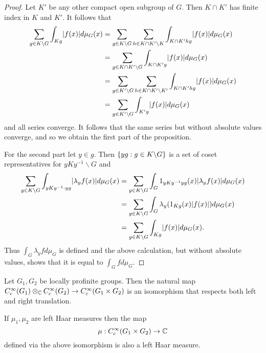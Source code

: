 \documentclass{memoir}
\begin{document}
\begin{proof}
    Let $K'$ be any other compact open subgroup of $G$.
    Then $K\cap K'$ has finite index in $K$ and $K'$.
    It follows that 
    \begin{align}
        \sum_{g\in K\backslash G}\int_{Kg}\lvert f(x)\rvert d\mu_G(x) &= \sum_{g\in K\backslash G}\sum_{h\in K\cap K'\backslash K}\int_{K\cap K' hg}\lvert f(x)\rvert d\mu_G(x) \nonumber \\
                                                              &= \sum_{g\in K\cap K'\backslash G}\int_{K\cap K' g}\lvert f(x)\rvert d\mu_G(x) \nonumber \\
                                                              &= \sum_{g\in K'\backslash G}\sum_{h\in K\cap K'\backslash K'}\int_{K\cap K' hg}\lvert f(x)\rvert d\mu_G(x) \nonumber \\
                                                              &= \sum_{g\in K'\backslash G}\int_{K' g}\lvert f(x)\rvert d\mu_G(x)
    \end{align}
    and all series converge.
    It follows that the same series but without absolute values converge, and so we obtain the first part of the proposition.

    For the second part let $y\in g$.
    Then $\lbrace yg:g\in K\backslash G\rbrace$ is a set of coset representatives for $yKy^{-1}\backslash G$ and
    \begin{align}
        \sum_{g\in K\backslash G}\int_{yKy^{-1}\cdot yg}\lvert\lambda_yf(x)\rvert d\mu_G(x) &= \sum_{g\in K\backslash G}\int_{G}1_{yKy^{-1}yg}(x)\lvert\lambda_yf(x)\rvert d\mu_G(x) \nonumber \\
                                                                                     &= \sum_{g\in K\backslash G}\int_{G}\lambda_y(1_{Kg}(x)\lvert f(x)\rvert)d\mu_G(x) \nonumber \\
                                                                                     &= \sum_{g\in K\backslash G}\int_{Kg}\lvert f(x)\rvert d\mu_G(x).
    \end{align}
    Thus $\int_G\lambda_yfd\mu_G$ is defined and the above calculation, but without absolute values, shows that it is equal to $\int_Gfd\mu_G$.
\end{proof}
\begin{proposition}
    Let $G_1,G_2$ be locally profinite groups.
    Then the natural map $C_c^\infty(G_1)\otimes_{\mathbb{C}} C_c^\infty(G_2)\to C_c^\infty(G_1\times G_2)$ is an isomorphism that respects both left and right translation.
\end{proposition}
\begin{proposition}
    If $\mu_1,\mu_2$ are left Haar measures then the map 
    \begin{equation}
        \mu:C_c^\infty(G_1\times G_2)\to \mathbb{C}
    \end{equation}
    defined via the above isomorphism is also a left Haar measure.
\end{proposition}
\end{document}
